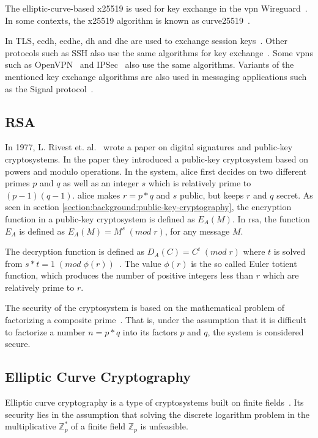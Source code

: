 The elliptic-curve-based \gls{x25519} is used for key exchange in the \gls{vpn} Wireguard~\cite{wireguard2020}. In some contexts, the \gls{x25519} algorithm is known as \gls{curve25519}~\cite{25519naming}.

In TLS, \gls{ecdh}, \gls{ecdhe}, \gls{dh} and \gls{dhe} are used to exchange session keys~\cite{rfc8446}. Other protocols such as SSH also use the same algorithms for key exchange~\cite{williams2011}. Some \glspl{vpn} such as OpenVPN~\cite{openvpn} and IPSec~\cite{rfc2409} also use the same algorithms. Variants of the mentioned key exchange algorithms are also used in messaging applications such as the Signal protocol~\cite{gordon2017}.

\subsection{RSA}

In 1977, L. Rivest et. al.~\cite{rsa1977} wrote a paper on digital signatures and public-key cryptosystems. In the paper they introduced a public-key cryptosystem based on powers and modulo operations. In the system, \gls{alice} first decides on two different primes $p$ and $q$ as well as an integer $s$ which is relatively prime to $(p-1)(q-1)$. \gls{alice} makes $r=p*q$ and $s$ public, but keeps $r$ and $q$ secret. As seen in section \ref{section:background:public-key-cryptography}, the encryption function in a public-key cryptosystem is defined as $E_A(M)$. In \gls{rsa}, the function $E_A$ is defined as $E_A(M)=M^s\;(mod\;r)$, for any message $M$.

The decryption function is defined as $D_A(C)=C^t\;(mod\;r)$ where $t$ is solved from $s*t=1\;(mod\;\phi(r))$~\cite{rsa1977}. The value $\phi(r)$ is the so called Euler totient function, which produces the number of positive integers less than $r$ which are relatively prime to $r$.

The security of the cryptosystem is based on the mathematical problem of factorizing a composite prime~\cite{rsa1977}. That is, under the assumption that it is difficult to factorize a number $n=p*q$ into its factors $p$ and $q$, the system is considered secure.

\subsection{Elliptic Curve Cryptography}

Elliptic curve cryptography is a type of cryptosystems built on finite fields~\cite{delfs2007}. Its security lies in the assumption that solving the discrete logarithm problem in the multiplicative $\mathbb{Z}_p^*$ of a finite field $\mathbb{Z}_p$ is unfeasible.

